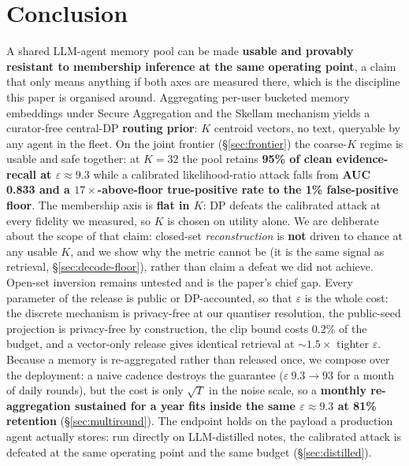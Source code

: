 \documentclass[pdflatex,sn-mathphys-num,iicol]{sn-jnl}
\theoremstyle{thmstyleone}%
\theoremstyle{thmstyletwo}%
\theoremstyle{thmstylethree}%
\newcommand{\eps}{\varepsilon}
\newcommand{\secref}[1]{\S\ref{#1}}
\begin{document}
\section{Conclusion}\label{sec:conclusion}

A shared LLM-agent memory pool can be made \textbf{usable and provably resistant to membership
inference at the same operating point}, a claim that only means anything if both axes are measured
there, which is the discipline this paper is organised around. Aggregating per-user bucketed memory
embeddings under Secure Aggregation and the Skellam mechanism yields a curator-free central-DP
\textbf{routing prior}: $K$ centroid vectors, no text, queryable by any agent in the fleet. On the
joint frontier (\secref{sec:frontier}) the coarse-$K$ regime is usable and safe together: at
$K = 32$ the pool retains \textbf{95\% of clean evidence-recall at $\eps \approx 9.3$} while a
calibrated likelihood-ratio attack falls from \textbf{AUC 0.833 and a $17\times$-above-floor
true-positive rate to the 1\% false-positive floor}. The membership axis is \textbf{flat in $K$}: DP
defeats the calibrated attack at every fidelity we measured, so $K$ is chosen on utility alone. We are
deliberate about the scope of that claim: closed-set \emph{reconstruction} is \textbf{not} driven to
chance at any usable $K$, and we show why the metric cannot be (it is the same signal as retrieval,
\secref{sec:decode-floor}), rather than claim a defeat we did not achieve. Open-set inversion
remains untested and is the paper's chief gap. Every parameter of the release is public or
DP-accounted, so that $\eps$ is the whole cost: the discrete mechanism is privacy-free at our
quantiser resolution, the public-seed projection is privacy-free by construction, the clip bound costs
0.2\% of the budget, and a vector-only release gives identical retrieval at ${\sim}1.5\times$ tighter
$\eps$. Because a memory is re-aggregated rather than released once, we compose over the deployment: a
naive cadence destroys the guarantee ($\eps\ 9.3 \to 93$ for a month of daily rounds), but the cost is
only $\sqrt{T}$ in the noise scale, so a \textbf{monthly re-aggregation sustained for a year fits inside
the same $\eps \approx 9.3$ at 81\% retention} (\secref{sec:multiround}). The endpoint holds on the
payload a production agent actually stores: run directly on LLM-distilled notes, the calibrated attack
is defeated at the same operating point and the same budget (\secref{sec:distilled}).
\end{document}
